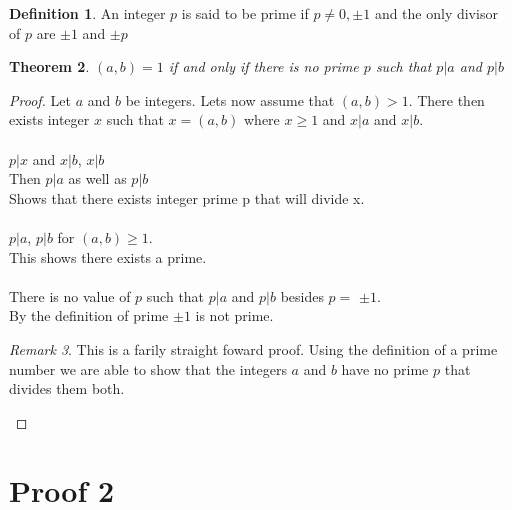 \documentclass{article}
\newtheorem{thm}{Theorem}[section]
\theoremstyle{definition}
\newtheorem{definition}[thm]{Definition}
\theoremstyle{remark}
\newtheorem{remark}[thm]{Remark}
\numberwithin{equation}{section}
\begin{document}
\begin{definition}\label{def}
An integer $p$ is said to be prime if $p \neq 0, \pm 1$ and the only divisor of $p$ are $\pm 1$ and $\pm p$\\
\end{definition}
\begin{thm}
$(a,b) = 1$ if and only if there is no prime $p$ such that $p|a$ and $p|b$\\
\end{thm}
\begin{proof}
Let $a$ and $b$ be integers. Lets now assume that $(a,b) > 1$. There then exists integer $x$ such that $x = (a,b)$ where $x \geq 1$ and $x|a$ and $x|b$. \\\\
$p|x$ and $x|b$, $x|b$\\
Then $p|a$ as well as $p|b$\\
Shows that there exists integer prime p that will divide x. \\\\
 $p|a$, $p|b$ for $(a,b) \geq 1$.\\
This shows there exists a prime.\\ \\
There is no value of $p$ such that $p|a$ and $p|b$ besides $p =$ $\pm 1$.\\
By the definition of prime $\pm 1$ is not prime.
\\
\begin{remark}
This is a farily straight foward proof. Using the definition of a prime number we are able to show that the integers $a$ and $b$ have no prime $p$ that divides them both.
\end{remark}

\end{proof}




\section{Proof 2}
\end{document}
